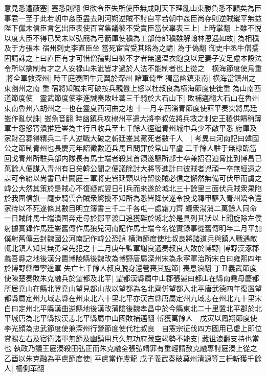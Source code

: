 意見悉遭蔽塞|{
	塞悉則翻}
但欲令臣失所使臣無成則天下理亂山東勝負悉不顧矣為臣事君一至于此若朝中姦臣盡去則河朔逆賊不討自平若朝中姦臣尚存則逆賊縱平無益陛下儻未信臣言乞出臣表使百官集議彼不受責臣當伏辜表三上|{
	上時掌翻}
上雖不悦以度大臣不得已癸未以弘簡為弓箭庫使稹為工部侍郎稹雖解翰林恩遇如故|{
	為相稹及于方張本}
宿州刺史李直臣坐當死宦官受其賂為之請|{
	為于偽翻}
御史中丞牛僧孺固請誅之上曰直臣有才可惜僧孺對曰彼不才者無過温衣飽食以足妻子安足慮本設法令所以擒制有才之人安禄山朱泚皆才過於人法不能制者也上從之　横海節度使烏重將全軍救深州|{
	時王庭湊圍牛元翼於深州}
諸軍倚重獨當幽鎮東南|{
	横海當鎮州之東幽州之南}
重宿將知賊未可破按兵觀釁上怒以杜叔良為横海節度使徙重為山南西道節度使　靈武節度使李進誠奏敗吐蕃三千騎於大石山下|{
	敗補邁翻大石山在魯州東南魯州六胡州之一也在靈夏西河曲之地}
十一月辛酉淄青節度使薛平奏突將馬廷崟作亂伏誅|{
	崟魚音翻}
時幽鎮兵攻棣州平遣大將李叔佐將兵救之刺史王稷供饋稍薄軍士怨怒宵潰推廷崟為主行且收兵至七千餘人徑逼青州城中兵少不敵平悉府庫及家財召募得精兵二千人逆戰大破之斬廷崟其黨死者數千人　|{
	考異曰河南記曰韓國公之節制青州也長慶元年詔徵數道兵馬且問罪於常山平盧二千餘人駐于無棣臨當回戈青州所駐兵部内隊長有馬士端者殺其首領遂驅所部士卒兼招召迫脅比到博昌已萬餘人便謀入青州有日矣韓公聞之便議除討大將等進計曰彼賊者兇頑一卒無經遠之謀可令紿以尚書已赴闕庭三軍將吏皆延頸以待留後賊必信之懈然無備可伏甲而虜之韓公大然其策於是賊心不復疑貳翌日引兵而來遂於城北三十餘里三面伏兵賊衆果陷於我圍信旗一麾步騎雲合賊衆驚擾不知所為悉皆降伏遂令投戈釋甲驅入青州矯令還家待以不死遂條其數目明立簿書三千二千各屯一處霜刀齊蟻衆湯消二萬餘人同命一日賊帥馬士端潰圍奔走尋於鄒平渡口追獲磔於城北於是具列其狀以上聞旋除左僕射據實録作馬廷崟舊傳作馬狼兒河南記作馬士端今名從實録事從舊傳明年二月平加僕射舊傳云封魏國公河南記作韓公恐誤}
横海節度使杜叔良將諸道兵與鎮人戰遇敵輒北鎮人知其無勇常先犯之十二月庚午監軍謝良通奏叔良大敗於博野|{
	博野漢涿郡蠡吾縣之地後漢分置博陵縣後魏改為博野唐屬深州宋為永寜軍治所宋白曰雍熙四年於博野縣置寧邊軍}
失亡七千餘人叔良脱身還營喪其旌節|{
	喪息浪翻}
丁丑義武節度使陳楚奏敗朱克融兵於望都及北平|{
	望都漢縣屬中山郡張晏曰都山在縣南堯母慶都所居堯山在縣北登堯山望見都山故以望都為名北齊併望都入北平唐武德四年復置望都縣屬定州九域志縣在州東北六十里北平亦漢古縣唐屬定州九域志在州北九十里宋白曰定州北平縣漢曲逆縣地後漢改蒲隂後魏孝昌中於今縣東北二十里置北平郡於北平城唐為北平縣按漢志北平縣屬中山國敗補邁翻}
斬獲萬餘人　戊寅以鳳翔節度使李光顔為忠武節度使兼深州行營節度使代杜叔良　自憲宗征伐四方國用已虚上即位賞賜左右及宿衛諸軍無節及幽鎮用兵久無功府藏空竭勢不能支|{
	藏徂浪翻支持也當也}
執政乃議王庭湊殺田弘正而朱克融全張弘靖罪有重輕請赦克融專討庭湊上從之乙酉以朱克融為平盧節度使|{
	平盧當作盧龍}
戊子義武奏破莫州清源等三柵斬獲千餘人|{
	柵側革翻}


